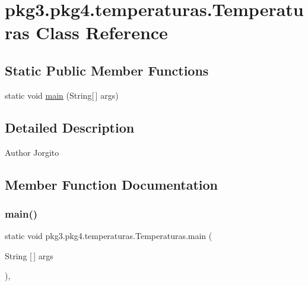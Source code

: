 \hypertarget{classpkg3_1_1pkg4_1_1temperaturas_1_1_temperaturas}{}\section{pkg3.\+pkg4.\+temperaturas.\+Temperaturas Class Reference}
\label{classpkg3_1_1pkg4_1_1temperaturas_1_1_temperaturas}
\subsection*{Static Public Member Functions}
\begin{DoxyCompactItemize}
\item 
static void \mbox{\hyperlink{classpkg3_1_1pkg4_1_1temperaturas_1_1_temperaturas_a5dd48ff7e52894f5d6bd57b7df54a43e}{main}} (String\mbox{[}$\,$\mbox{]} args)
\end{DoxyCompactItemize}


\subsection{Detailed Description}
\begin{DoxyAuthor}{Author}
Jorgito 
\end{DoxyAuthor}


\subsection{Member Function Documentation}
\mbox{\label{classpkg3_1_1pkg4_1_1temperaturas_1_1_temperaturas_a5dd48ff7e52894f5d6bd57b7df54a43e}} 
\subsubsection{\texorpdfstring{main()}{main()}}
{\footnotesize\ttfamily static void pkg3.\+pkg4.\+temperaturas.\+Temperaturas.\+main (\begin{DoxyParamCaption}\item[{String \mbox{[}$\,$\mbox{]}}]{args }\end{DoxyParamCaption})\hspace{0.3cm}{\ttfamily [inline]}, {\ttfamily [static]}}


